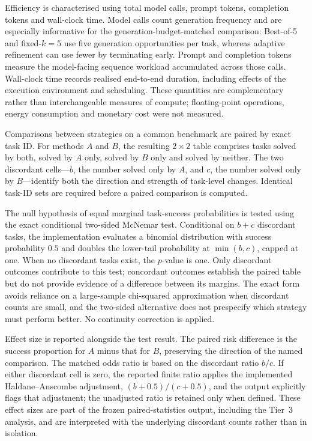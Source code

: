 Efficiency is characterised using total model calls, prompt tokens, completion tokens and wall-clock time. Model calls count generation frequency and are especially informative for the generation-budget-matched comparison: Best-of-5 and fixed-$k=5$ use five generation opportunities per task, whereas adaptive refinement can use fewer by terminating early. Prompt and completion tokens measure the model-facing sequence workload accumulated across those calls. Wall-clock time records realised end-to-end duration, including effects of the execution environment and scheduling. These quantities are complementary rather than interchangeable measures of compute; floating-point operations, energy consumption and monetary cost were not measured.

Comparisons between strategies on a common benchmark are paired by exact task ID. For methods $A$ and $B$, the resulting $2\times2$ table comprises tasks solved by both, solved by $A$ only, solved by $B$ only and solved by neither. The two discordant cells---$b$, the number solved only by $A$, and $c$, the number solved only by $B$---identify both the direction and strength of task-level changes. Identical task-ID sets are required before a paired comparison is computed.

The null hypothesis of equal marginal task-success probabilities is tested using the exact conditional two-sided McNemar test. Conditional on $b+c$ discordant tasks, the implementation evaluates a binomial distribution with success probability $0.5$ and doubles the lower-tail probability at $\min(b,c)$, capped at one. When no discordant tasks exist, the $p$-value is one. Only discordant outcomes contribute to this test; concordant outcomes establish the paired table but do not provide evidence of a difference between its margins. The exact form avoids reliance on a large-sample chi-squared approximation when discordant counts are small, and the two-sided alternative does not prespecify which strategy must perform better. No continuity correction is applied.

Effect size is reported alongside the test result. The paired risk difference is the success proportion for $A$ minus that for $B$, preserving the direction of the named comparison. The matched odds ratio is based on the discordant ratio $b/c$. If either discordant cell is zero, the reported finite ratio applies the implemented Haldane--Anscombe adjustment, $(b+0.5)/(c+0.5)$, and the output explicitly flags that adjustment; the unadjusted ratio is retained only when defined. These effect sizes are part of the frozen paired-statistics output, including the Tier~3 analysis, and are interpreted with the underlying discordant counts rather than in isolation.

